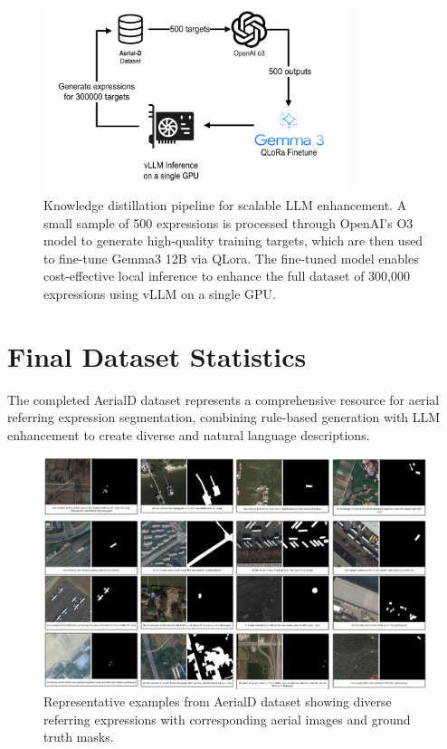 \begin{figure}[H]
\centering
\includegraphics[width=0.8\textwidth]{./Images/distillation.png}
\caption{Knowledge distillation pipeline for scalable LLM enhancement. A small sample of 500 expressions is processed through OpenAI's O3 model to generate high-quality training targets, which are then used to fine-tune Gemma3 12B via QLora. The fine-tuned model enables cost-effective local inference to enhance the full dataset of 300,000 expressions using vLLM on a single GPU.}
\label{fig:llm_distillation}
\end{figure}


\section{Final Dataset Statistics}

The completed AerialD dataset represents a comprehensive resource for aerial referring expression segmentation, combining rule-based generation with LLM enhancement to create diverse and natural language descriptions.

\begin{figure}[H]
\centering
\includegraphics[width=\textwidth]{./Images/dataset.png}
\caption{Representative examples from AerialD dataset showing diverse referring expressions with corresponding aerial images and ground truth masks.}
\label{fig:dataset_examples}
\end{figure}

